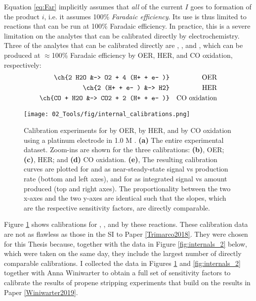 Equation \ref{eq:Far} implicitly assumes that \textit{all} of the current $I$ goes to formation of the product $i$, i.e. it assumes 100\% \textit{Faradaic efficiency}. Its use is thus limited to reactions that can be run at 100\% Faradaic efficiency. In practice, this is a severe limitation on the analytes that can be calibrated directly by electrochemistry. Three of the analytes that can be calibrated directly are , , and , which can be produced at $\approx$100\% Faradaic efficiency by OER, HER, and CO oxidation, respectively:
\begin{align}
\ch{2 H2O &-> O2 + 4 (H+ + e- )} &&\text{OER}\label{rxn:OER2}\\
\ch{2 (H+ + e- ) &-> H2} &&\text{HER}\label{rxn:HER2}\\
\ch{CO + H2O &-> CO2 + 2 (H+ + e- )} &&\label{rxn:COox2}\text{CO oxidation}
\end{align}
\begin{figure}[h!]
	\texttt{[image: 02\_Tools/fig/internal\_calibrations.png]}
	\caption{Calibration experiments for  by OER,  by HER, and  by CO oxidation using a platinum electrode in 1.0 M . \textbf{(a)} The entire experimental dataset. Zoom-ins are shown for the three calibrations: \textbf{(b)}, OER; \textbf{(c)}, HER; and \textbf{(d)} CO oxidation. \textbf{(e)}, The resulting calibration curves are plotted for  and  as near-steady-state signal vs production rate (bottom and left axes), and for  as integrated signal vs amount produced (top and right axes). The proportionality between the two x-axes and the two y-axes are identical such that the slopes, which are the respective sensitivity factors, are directly comparable.
	}
	\label{fig:internals}
\end{figure}
Figure \ref{fig:internals} shows calibrations for , , and  by these reactions. These calibration data are not as flawless as those in the SI to Paper \ref{Trimarco2018}. They were chosen for this Thesis because, together with the data in Figure \ref{fig:internals_2} below, which were taken on the same day, they include the largest number of directly comparable calibrations. I collected the data in Figures \ref{fig:internals} and \ref{fig:internals_2} together with Anna Winiwarter to obtain a full set of sensitivity factors to calibrate the results of propene stripping experiments that build on the results in Paper \ref{Winiwarter2019}.

